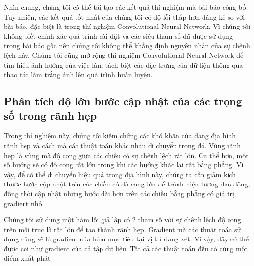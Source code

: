 Nhìn chung, chúng tôi có thể tái tạo các kết quả thí nghiệm mà bài báo công bố. Tuy nhiên, các kết quả tốt nhất của chúng tôi có độ lỗi thấp hơn đáng kể so với bài báo, đặc biệt là trong thí nghiệm Convolutional Neural Network. Vì chúng tôi không biết chính xác quá trình cài đặt và các siêu tham số đã được sử dụng trong bài báo gốc nên chúng tôi không thể khẳng định nguyên nhân của sự chênh lệch này. Chúng tôi cũng mở rộng thí nghiệm Convolutional Neural Network để tìm hiểu ảnh hưởng của việc làm tách biệt các đặc trưng của dữ liệu thông qua thao tác làm trắng ảnh lên quá trình huấn luyện.

\subsection{Phân tích độ lớn bước cập nhật của các trọng số trong rãnh hẹp}
\label{exp:step-size}

Trong thí nghiệm này, chúng tôi kiểm chứng các khó khăn của dạng địa hình rãnh hẹp và cách mà các thuật toán khác nhau di chuyển trong đó. Vùng rãnh hẹp là vùng mà độ cong giữa các chiều có sự chênh lệch rất lớn. Cụ thể hơn, một số hướng sẽ có độ cong rất lớn trong khi các hướng khác lại rất bằng phẳng. Vì vậy, để có thể di chuyển hiệu quả trong địa hình này, chúng ta cần giảm kích thước bước cập nhật trên các chiều có độ cong lớn để tránh hiện tượng dao động, đồng thời cập nhật những bước dài hơn trên các chiều bằng phẳng có giá trị gradient nhỏ.

Chúng tôi sử dụng một hàm lỗi giả lập có 2 tham số với sự chênh lệch độ cong trên mỗi trục là rất lớn để tạo thành rãnh hẹp. Gradient mà các thuật toán sử dụng cũng sẽ là gradient của hàm mục tiêu tại vị trí đang xét. Vì vậy, đây có thể được coi như gradient của cả tập dữ liệu. Tất cả các thuật toán đều có cùng một điểm xuất phát.

